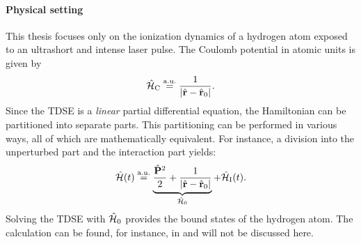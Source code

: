 \paragraph{Physical setting}
This thesis focuses only on the ionization dynamics of a hydrogen atom exposed to an ultrashort and intense laser pulse.
The Coulomb potential in atomic units is given by
\begin{equation*}
    \hat{\mathcal{H}}_{\mathrm{C}} \stackrel{\mathrm{a.u.}}{=} \frac{1}{|\hat{\mathbf{r}}-\hat{\mathbf{r}}_0|}.
\end{equation*}
Since the TDSE is a \emph{linear} partial differential equation, the Hamiltonian can be partitioned into separate parts.
This partitioning can be performed in various ways, all of which are mathematically equivalent.
For instance, a division into the unperturbed part and the interaction part yields:
\begin{equation*}
    \hat{\mathcal{H}}(t) \stackrel{\mathrm{a.u.}}{=} \underbrace{\frac{\hat{\mathbf{P}}^2}{2}+\frac{1}{|\hat{\mathbf{r}}-\hat{\mathbf{r}}_0|}}_{\hat{\mathcal{H}}_0} + \hat{\mathcal{H}}_{\mathrm{I}}(t).
\end{equation*}
Solving the TDSE with $\hat{\mathcal{H}}_0$ provides the bound states of the hydrogen atom.
The calculation can be found, for instance, in \cite{sakurai} and will not be discussed here.




